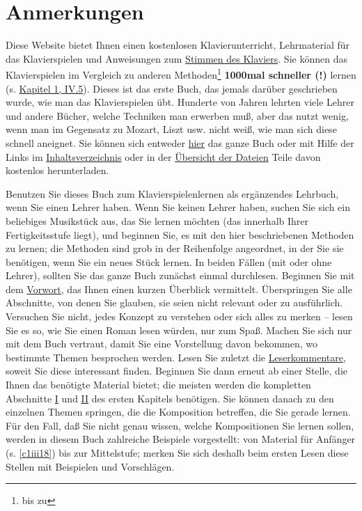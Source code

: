 
\chapter{Anmerkungen}
\label{anmerkungen}

Diese Website bietet Ihnen einen kostenlosen Klavierunterricht, Lehrmaterial für das Klavierspielen und Anweisungen zum \hyperref[c2_1]{Stimmen des Klaviers}.
Sie können das Klavierspielen im Vergleich zu anderen Methoden\footnote{bis zu} \textbf{1000mal schneller (!)} lernen (s. \hyperref[c1iv5]{Kapitel 1, IV.5}).
Dieses ist das erste Buch, das jemals darüber geschrieben wurde, wie man das Klavierspielen übt.
Hunderte von Jahren lehrten viele Lehrer und andere Bücher, welche Techniken man erwerben muß, aber das nutzt wenig, wenn man im Gegensatz zu Mozart, Liszt usw. nicht weiß, wie man sich diese schnell aneignet.
Sie können sich entweder \hyperref[copy]{hier} das ganze Buch oder mit Hilfe der Links im \hyperref[Inhalt]{Inhaltsverzeichnis} oder in der \href{./dateien.html\#copy}{Übersicht der Dateien} Teile davon kostenlos herunterladen.

Benutzen Sie dieses Buch zum Klavierspielenlernen als ergänzendes Lehrbuch, wenn Sie einen Lehrer haben.
Wenn Sie keinen Lehrer haben, suchen Sie sich ein beliebiges Musikstück aus, das Sie lernen möchten (das innerhalb Ihrer Fertigkeitsstufe liegt), und beginnen Sie, es mit den hier beschriebenen Methoden zu lernen; die Methoden sind grob in der Reihenfolge angeordnet, in der Sie sie benötigen, wenn Sie ein neues Stück lernen.
In beiden Fällen (mit oder ohne Lehrer), sollten Sie das ganze Buch zunächst einmal durchlesen.
Beginnen Sie mit dem \hyperref[preface]{Vorwort}, das Ihnen einen kurzen Überblick vermittelt.
Überspringen Sie alle Abschnitte, von denen Sie glauben, sie seien nicht relevant oder zu ausführlich.
Versuchen Sie nicht, jedes Konzept zu verstehen oder sich alles zu merken -- lesen Sie es so, wie Sie einen Roman lesen würden, nur zum Spaß.
Machen Sie sich nur mit dem Buch vertraut, damit Sie eine Vorstellung davon bekommen, wo bestimmte Themen besprochen werden.
Lesen Sie zuletzt die \hyperref[testimonials]{Leserkommentare}, soweit Sie diese interessant finden.
Beginnen Sie dann erneut ab einer Stelle, die Ihnen das benötigte Material bietet; die meisten werden die kompletten Abschnitte \hyperref[c1i1]{I} und \hyperref[c1ii1]{II} des ersten Kapitels benötigen.
Sie können danach zu den einzelnen Themen springen, die die Komposition betreffen, die Sie gerade lernen.
Für den Fall, daß Sie nicht genau wissen, welche Kompositionen Sie lernen sollen, werden in diesem Buch zahlreiche Beispiele vorgestellt: von Material für Anfänger (s. \hyperref[c1iii18]{\autoref{c1iii18}}) bis zur Mittelstufe; merken Sie sich deshalb beim ersten Lesen diese Stellen mit Beispielen und Vorschlägen.

